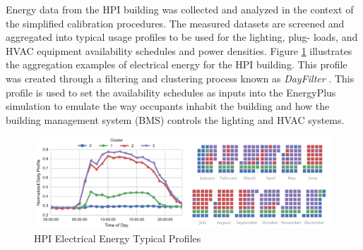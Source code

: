 \documentclass{tBPS2e}
\theoremstyle{plain}
\theoremstyle{definition}
\theoremstyle{remark}
\newcommand{\noteDT}[1]{\footnote{\textcolor{green}{#1}}}
\begin{document}
Energy data from the HPI building was collected and analyzed in the context of
the simplified calibration procedures. The measured datasets are screened and
aggregated into typical usage profiles to be used for the lighting, plug-
loads, and HVAC equipment availability schedules and power densities. Figure
\ref{fig:hpi_elec_profiles} illustrates the aggregation examples of electrical
energy for the HPI building. This profile was created through a filtering and
clustering process known as \emph{DayFilter} \citep{Miller:2015kr}. This
profile is used to set the availability schedules as inputs into the
EnergyPlus simulation to emulate the way occupants inhabit the building and
how the building management system (BMS) controls the lighting and HVAC
systems. 

\begin{figure}[H]
\centering
\includegraphics[scale=0.55]{figures/HPI_combinedclusterandcal_5}
\caption{HPI Electrical Energy Typical Profiles}
\label{fig:hpi_elec_profiles}
\end{figure}
\end{document}

